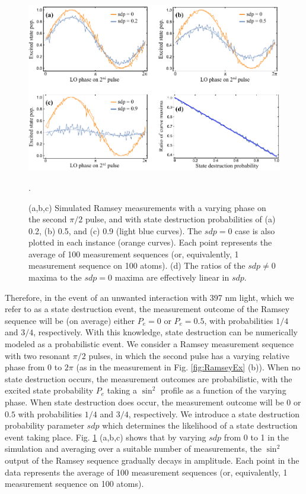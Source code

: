 \begin{figure}[t]
    \begin{center}
        \includegraphics{figures/5/Fig_sdpsims}
        \caption{\label{fig:sdpsim} (a,b,c) Simulated Ramsey measurements with a varying phase on the second $\pi / 2$ pulse, and with state destruction probabilities of (a) 0.2, (b) 0.5, and (c) 0.9 (light blue curves). The $sdp = 0$ case is also plotted in each instance (orange curves). Each point represents the average of 100 measurement sequences (or, equivalently, 1 measurement sequence on 100 atoms). (d) The ratios of the $sdp \neq 0$ maxima to the $sdp = 0$ maxima are effectively linear in $sdp$. }. 
    \end{center}
\end{figure}

Therefore, in the event of an unwanted interaction with 397 nm light, which we refer to as a state destruction event, the measurement outcome of the Ramsey sequence will be (on average) either $P_e = 0$ or $P_e = 0.5$, with probabilities $1/4$ and $3/4$, respectively. With this knowledge, state destruction can be numerically modeled as a probabilistic event. We consider a Ramsey measurement sequence with two resonant $\pi /2$ pulses, in which the second pulse has a varying relative phase from 0 to $2 \pi$ (as in the measurement in Fig. \ref{fig:RamseyEx} (b)). When no state destruction occurs, the measurement outcomes are probabilistic, with the excited state probability $P_e$ taking a $\sin^2$ profile as a function of the varying phase. When state destruction does occur, the measurement outcome will be $0$ or $0.5$ with probabilities $1/4$ and $3/4$, respectively. We introduce a state destruction probability parameter $sdp$ which determines the likelihood of a state destruction event taking place. Fig. \ref{fig:sdpsim} (a,b,c) shows that by varying $sdp$ from 0 to 1 in the simulation and averaging over a suitable number of measurements, the $\sin^2$ output of the Ramsey sequence gradually decays in amplitude. Each point in the data represents the average of 100 measurement sequences (or, equivalently, 1 measurement sequence on 100 atoms).

